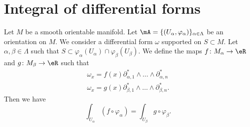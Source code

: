 \section{Integral of differential forms}


\begin{proposition}	\label{PROPooGVQDooNwnGXs}
	Let \( M\) be a smooth orientable manifold. Let \( \mA= \{ (U_{\alpha},\varphi_{\alpha}) \}_{\alpha\in \Lambda}\) be an orientation on \( M\). We consider a differential form \( \omega\) supported on \( S\subset M\). Let \( \alpha,\beta\in\Lambda\) such that \( S\subset\varphi_{\alpha}(U_{\alpha})\cap\varphi_{\beta}(U_{\beta})\). We define the maps \(f \colon M_{\alpha}\to \eR  \) and \(g \colon M_{\beta}\to \eR  \) such that
	\begin{subequations}
		\begin{align}
			\omega_x=f(x)\partial_{\alpha,1}^*\wedge\ldots\wedge\partial_{\alpha,n}^* \\
			\omega_x=g(x)\partial_{\beta,1}^*\wedge\ldots\wedge\partial_{\beta,n}^*.
		\end{align}
	\end{subequations}
	Then we have
	\begin{equation}
		\int_{U_{\alpha}}(f\circ \varphi_{\alpha})=\int_{U_{\beta}}g\circ\varphi_{\beta}.
	\end{equation}
\end{proposition}

